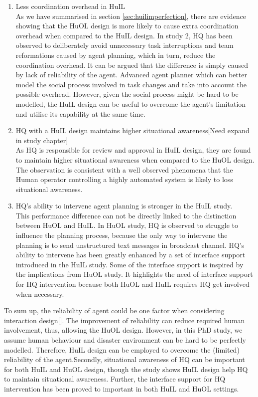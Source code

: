 \begin{enumerate}
\item Less coordination overhead in HuIL \\
As we have summarised in section \ref{sec:huilimperfection}, there are evidence showing that the HuOL design is more likely to cause extra coordination overhead when compared to the HuIL design. In study 2, HQ has been observed to deliberately avoid unnecessary task interruptions and team reformations caused by agent planning, which in turn, reduce the coordination overhead. It can be argued that the difference is simply caused by lack of reliability of the agent. Advanced agent planner which can better model the social process involved in task changes and take into account the possible overhead. However, given the social process might be hard to be modelled, the HuIL design can be useful to overcome the agent's limitation and utilise its capability at the same time.\\


\item HQ with a HuIL design maintains higher situational awareness[Need expand in study chapter]\\
As HQ is responsible for review and approval in HuIL design, they are found to maintain higher situational awareness when compared to the HuOL design. The observation is consistent with a well observed phenomena that the Human operator controlling a highly automated system is likely to loss situational awareness.\\


\item HQ's ability to intervene agent planning is stronger in the HuIL study.\\
This performance difference can not be directly linked to the distinction between HuOL and HuIL. In HuOL study, HQ is observed to struggle to influence the planning process, because the only way to intervene the planning is to send unstructured text messages in broadcast channel. HQ's ability to intervene has been greatly enhanced by a set of interface support introduced in the HuIL study. Some of the interface support is inspired by the implications from HuOL study. It highlights the need of interface support for HQ intervention because both HuOL and HuIL requires HQ get involved when necessary. \\

\end{enumerate}

To sum up, the reliability of agent could be one factor when considering interaction design[]. The improvement of reliability can reduce required human involvement, thus, allowing the HuOL design. However, in this PhD study, we assume human behaviour and disaster environment can be hard to be perfectly modelled. Therefore, HuIL design can be employed to overcome the (limited) reliability of the agent.Secondly, situational awareness of HQ can be important for both HuIL and HuOL design, though the study shows HuIL design help HQ to maintain situational awareness. Further, the interface support for HQ intervention has been proved to important in both HuIL and HuOL settings.\\


